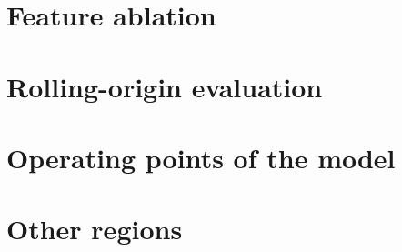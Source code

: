 \documentclass{article}
\begin{document}



\appendix

\section{Feature ablation}
\label{app:ablation}

\begin{table}[h]
  \centering
  \caption{Test lift and AUROC by feature set, mean of three seeds. Hour-end AUROC is measured among the windows where a spike is possible.}
  \small
  
\end{table}

\section{Rolling-origin evaluation}
\label{app:rolling}

\begin{table}[h]
  \centering
  \caption{The model retrained from scratch at five cut-off dates and tested on each following nine-day block.}
  \small
  
\end{table}

\section{Operating points of the model}
\label{app:operating}

\begin{table}[h]
  \centering
  \caption{The model at each alarm budget on the October test slice: recall and precision against price-spike events, and slowdown for 15-node jobs with 300 second checkpoints. Intervals resample whole days.}
  \small
  
\end{table}

\section{Other regions}
\label{app:regions}

\begin{table}[h]
  \centering
  \caption{15-node jobs with 300 second checkpoints. Difference is the slowdown removed relative to Young-Daly, so positive favours the model. Intervals resample whole days.}
  \small
  
\end{table}
\end{document}
